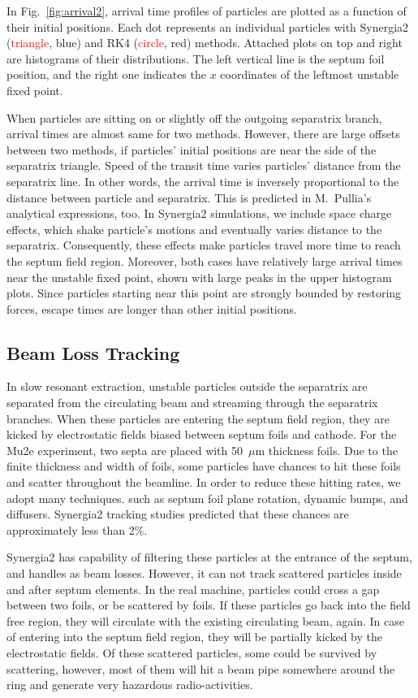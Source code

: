 \documentclass[review,1p,number,fleqn,a4paper]{elsarticle}
\begin{document}
In Fig.~\ref{fig:arrival2}, arrival time profiles of particles are plotted as a function of their initial positions. Each dot represents an individual particles with Synergia2 (\textcolor{red}{triangle}, blue) and RK4 (\textcolor{red}{circle}, red) methods. Attached plots on top and right are histograms of their distributions. The left vertical line is the septum foil position, and the right one indicates the $x$ coordinates of the leftmost unstable fixed point. 

When particles are sitting on or slightly off the outgoing separatrix branch, arrival times are almost same for two methods. However, there are large offsets between two methods, if particles' initial positions are near the side of the separatrix triangle. Speed of the transit time varies particles' distance from the separatrix line. In other words, the arrival time is inversely proportional to the distance between particle and separatrix. This is predicted in M.~Pullia's analytical expressions, too. In Synergia2 simulations, we include space charge effects, which shake particle's motions and eventually varies distance to the separatrix. Consequently, these effects make particles travel more time to reach the septum field region. Moreover, both cases have relatively large arrival times near the unstable fixed point, shown with large peaks in the upper histogram plots. Since particles starting near this point are strongly bounded by restoring forces, escape times are longer than other initial positions. 


\subsection{\label{sec:beamloss}Beam Loss Tracking}

In slow resonant extraction, unstable particles outside the separatrix are separated from the circulating beam and streaming through the separatrix branches. When these particles are entering the septum field region, they are kicked by electrostatic fields biased between septum foils and cathode. For the Mu2e experiment, two septa are placed with 50~$\mu$m thickness foils. Due to the finite thickness and width of foils, some particles have chances to hit these foils and scatter throughout the beamline. In order to reduce these hitting rates, we adopt many techniques. such as septum foil plane rotation, dynamic bumps, and diffusers. Synergia2 tracking studies predicted that these chances are approximately less than 2\%. 

Synergia2 has capability of filtering these particles at the entrance of the septum, and handles as beam losses. However, it can not track scattered particles inside and after septum elements. In the real machine, particles could cross a gap between two foils, or be scattered by foils. If these particles go back into the field free region, they will circulate with the existing circulating beam, again. In case of entering into the septum field region, they will be partially kicked by the electrostatic fields. Of these scattered particles, some could be survived by scattering, however, most of them will hit a beam pipe somewhere around the ring and generate very hazardous radio-activities.
\end{document}
